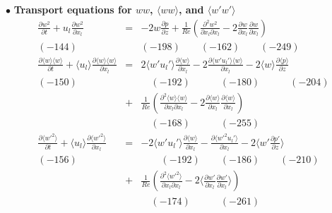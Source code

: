 \documentclass[a4paper,11pt]{article}
\begin{document}
\noindent $\bullet$  \textbf{Transport equations for $ww$, $\langle ww\rangle$, and $\langle w'w'\rangle$}
\begin{eqnarray}
\frac{\partial w^2 }{\partial t}
+u_l\frac{\partial w^2 }{\partial x_l}
&=&-2w\frac{\partial p }{\partial z}
+\frac{1}{Re}(\frac{\partial^2 w^2 }{\partial x_l\partial x_l}-2\frac{\partial w }{\partial x_l}\frac{\partial w }{\partial x_l}) \\
(-144) &&(-198) \quad{}  \quad{} (-162) \quad{} \quad{} (-249)\nonumber \\
\frac{\partial \langle w\rangle \langle w\rangle }{\partial t}
+\langle u_l\rangle \frac{\partial \langle w\rangle \langle w\rangle }{\partial x_l}
&=&2\langle w'u_l'\rangle \frac{\partial \langle w \rangle}{\partial x_l}
-2\frac{\partial \langle w'u_l'\rangle \langle w \rangle }{\partial x_l}
-2\langle w\rangle \frac{\partial \langle p\rangle }{\partial z} \nonumber \\
(-150) \quad{}&&\quad{} (-192) \quad{} \qquad{} (-180)  \quad{} \qquad{} (-204)\nonumber \\
&+&\frac{1}{Re}(\frac{\partial^2 \langle w\rangle \langle w \rangle}{\partial x_l\partial x_l}-2\frac{\partial \langle w\rangle }{\partial x_l} \frac{\partial \langle w\rangle }{\partial x_l}) \\
&&\quad{}(-168) \quad{} \qquad{} (-255) \nonumber \\
\frac{\partial \langle w'^2\rangle }{\partial t}
+\langle u_l\rangle \frac{\partial \langle w'^2\rangle }{\partial x_l}
&=&-2\langle w'u_l'\rangle \frac{\partial \langle w \rangle}{\partial x_l}
-\frac{\partial \langle w'^2u_l'\rangle}{\partial x_l}-2\langle w' \frac{\partial  p'}{\partial z}\rangle \nonumber \\
(-156)\quad{} &&\quad{}\quad{} (-192) \quad{} \quad{} (-186) \qquad{}  (-210) \nonumber \\
&+&\frac{1}{Re}(\frac{\partial^2 \langle w'^2 \rangle}{\partial x_l\partial x_l}-2\langle \frac{\partial  w' }{\partial x_l}\frac{\partial  w' }{\partial x_l}\rangle) \\
&&\quad{} (-174) \qquad{} \quad{}(-261) \nonumber
\end{eqnarray}
\end{document}
